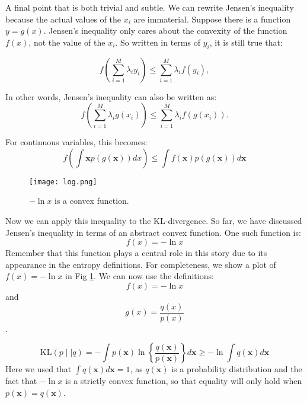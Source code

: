 A final point that is both trivial and subtle. We can rewrite Jensen's inequality because the actual values of the $x_i$ are immaterial. Suppose there is a function
$y=g(x)$. Jensen's inequality only cares about the convexity of the function $f(x)$, not the value of the $x_i$. So written in terms of $y_i$, it is still true that:

$$
  f(\sum^M_{i=1} \lambda_i y_i) \le \sum^M_{i=1} \lambda_i f(y_i),
  $$

In other words, Jensen's inequality can also be written as:
$$
  f(\sum^M_{i=1} \lambda_i g(x_i)) \le \sum^M_{i=1} \lambda_i f(g(x_i)).
  $$
  



  
For continuous variables, this becomes:
\begin{equation}
  f( \int \boldsymbol{x} p(g(\boldsymbol{x})) dx ) \le \int f(\boldsymbol{x}) p(g(\boldsymbol{x})) d \boldsymbol{x}
\end{equation}



\begin{figure}
  \begin{center}
  \texttt{[image: log.png]}
  \end{center}
  \caption{$ -\ln x$ is a convex function.}
  \label{fig-log}
\end{figure}

Now we can apply this inequality to the KL-divergence. So far, we have discussed Jensen's inequality in terms of an abstract convex function. One such function is:
\begin{equation}
  f(x) = -\ln x
\end{equation}
Remember that this function plays a central role in this story due to its appearance in the entropy definitions. For completeness, we show a plot of
$f(x) = -\ln x$ in Fig \ref{fig-log}. We can now use the definitions:
$$
f(x) = -\ln x
$$
and
$$
g(x) = \frac{q(x)}{p(x)}
$$.


\begin{equation}
\mbox{KL}(p \mid \mid q) = - \int p(\boldsymbol{x}) \ln  \left\{ \frac{q(\boldsymbol{x})}{p(\boldsymbol{x})}
\right\}  d \boldsymbol{x} \ge -\ln \int q( \boldsymbol{x}) d \boldsymbol{x}
\label{eq-kl}
\end{equation}
Here we used that $\int q(\boldsymbol{x}) d \boldsymbol{x} = 1$, as $q(\boldsymbol{x})$ is a probability distribution and the fact that $-\ln x$ is a strictly
convex function, so that equality will only hold when $p(\boldsymbol{x})= q(\boldsymbol{x})$.

